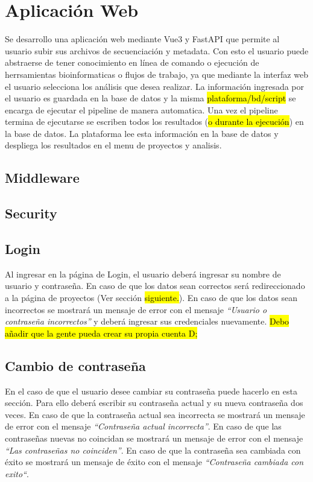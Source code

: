 \section{Aplicación Web}
Se desarrollo una aplicación web mediante Vue3 y FastAPI que permite al usuario subir sus archivos de secuenciación y metadata. Con esto el usuario puede abstraerse de tener conocimiento en línea de comando o ejecución de herrsamientas bioinformaticas o flujos de trabajo, ya que mediante la interfaz web el usuario selecciona los análisis que desea realizar.
La información ingresada por el usuario es guardada en la base de datos y la misma \hl{plataforma/bd/script} se encarga de ejecutar el pipeline de manera automatica.
Una vez el pipeline termina de ejecutarse se escriben todos los resultados (\hl{o durante la ejecución}) en la base de datos. La plataforma lee esta información en la base de datos y despliega los resultados en el menu de proyectos y analisis.

\subsection{Middleware}
\subsection{Security}

\subsection{Login}
Al ingresar en la página de Login, el usuario deberá ingresar su nombre de usuario y contraseña. En caso de que los datos sean correctos será redireccionado a la página de proyectos (Ver sección \hl{siguiente.}). En caso de que los datos sean incorrectos se mostrará un mensaje de error con el mensaje 
\textit{“Usuario o contraseña incorrectos”} y deberá ingresar sus credenciales nuevamente.
\hl{Debo añadir que la gente pueda crear su propia cuenta D;}
\subsection{Cambio de contraseña}
En el caso de que el usuario desee cambiar su contraseña puede hacerlo en esta sección. Para ello deberá escribir su contraseña actual y su nueva contraseña dos veces. En caso de que la contraseña actual sea incorrecta se mostrará un mensaje de error con el mensaje \textit{“Contraseña actual incorrecta”}. En caso de que las contraseñas nuevas no coincidan se mostrará un mensaje de error con el mensaje \textit{“Las contraseñas no coinciden”}. En caso de que la contraseña sea cambiada con éxito se mostrará un mensaje de éxito con el mensaje \textit{“Contraseña cambiada con exito“}.
